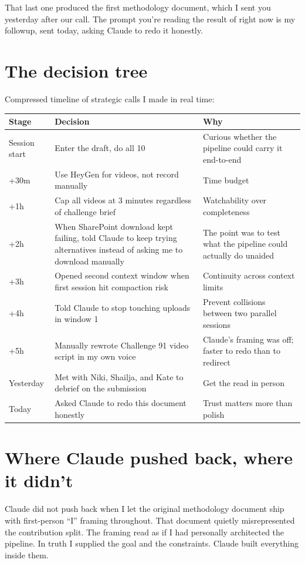 \documentclass[12pt, letterpaper]{article}
\begin{document}
That last one produced the first methodology document, which I sent you yesterday after our call. The prompt you're reading the result of right now is my followup, sent today, asking Claude to redo it honestly.

\section{The decision tree}

Compressed timeline of strategic calls I made in real time:

\begin{longtable}{p{1in} p{2.5in} p{2.4in}}
\toprule
\textbf{Stage} & \textbf{Decision} & \textbf{Why} \\
\midrule
\endhead
Session start & Enter the draft, do all 10 & Curious whether the pipeline could carry it end-to-end \\
+30m & Use HeyGen for videos, not record manually & Time budget \\
+1h & Cap all videos at 3 minutes regardless of challenge brief & Watchability over completeness \\
+2h & When SharePoint download kept failing, told Claude to keep trying alternatives instead of asking me to download manually & The point was to test what the pipeline could actually do unaided \\
+3h & Opened second context window when first session hit compaction risk & Continuity across context limits \\
+4h & Told Claude to stop touching uploads in window 1 & Prevent collisions between two parallel sessions \\
+5h & Manually rewrote Challenge 91 video script in my own voice & Claude's framing was off; faster to redo than to redirect \\
Yesterday & Met with Niki, Shailja, and Kate to debrief on the submission & Get the read in person \\
Today & Asked Claude to redo this document honestly & Trust matters more than polish \\
\bottomrule
\end{longtable}

\section{Where Claude pushed back, where it didn't}

Claude did not push back when I let the original methodology document ship with first-person ``I'' framing throughout. That document quietly misrepresented the contribution split. The framing read as if I had personally architected the pipeline. In truth I supplied the goal and the constraints. Claude built everything inside them.
\end{document}
